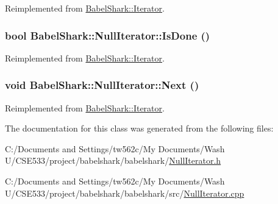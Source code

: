Reimplemented from \hyperlink{class_babel_shark_1_1_iterator_84ac6a7e539a944a6f67590c8e882001}{BabelShark::Iterator}.\hypertarget{class_babel_shark_1_1_null_iterator_660ce1fb9a79f50269015e945d126baf}{
\subsubsection[{IsDone}]{\setlength{\rightskip}{0pt plus 5cm}bool BabelShark::NullIterator::IsDone ()}}
\label{class_babel_shark_1_1_null_iterator_660ce1fb9a79f50269015e945d126baf}




Reimplemented from \hyperlink{class_babel_shark_1_1_iterator_85852cf1ca186d86b07336c100d9834d}{BabelShark::Iterator}.\hypertarget{class_babel_shark_1_1_null_iterator_66a47f978ee58a3ee639494aac25bb7c}{
\subsubsection[{Next}]{\setlength{\rightskip}{0pt plus 5cm}void BabelShark::NullIterator::Next ()}}
\label{class_babel_shark_1_1_null_iterator_66a47f978ee58a3ee639494aac25bb7c}




Reimplemented from \hyperlink{class_babel_shark_1_1_iterator_5fb7aa35b296dfa34aa1203b6500f2e5}{BabelShark::Iterator}.

The documentation for this class was generated from the following files:\begin{CompactItemize}
\item 
C:/Documents and Settings/tw562c/My Documents/Wash U/CSE533/project/babelshark/babelshark/\hyperlink{_null_iterator_8h}{NullIterator.h}\item 
C:/Documents and Settings/tw562c/My Documents/Wash U/CSE533/project/babelshark/babelshark/src/\hyperlink{_null_iterator_8cpp}{NullIterator.cpp}\end{CompactItemize}
